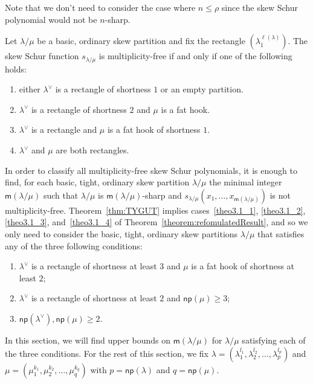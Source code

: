 \documentclass[ALCO,ThmDefs,Unicode,epreuves]{cedram}
\newcommand{\np}{\mathsf{np}}
\newcommand{\msf}{\mathsf{m}}
\begin{document}
Note that we don't need to consider the case where $n\leq \rho$ since the skew Schur polynomial would not be $n$-sharp.



\begin{theorem}[\cite{G10, TY10}]
\label{thm:TYGUT}
 Let $\lambda/\mu$ be a basic, ordinary skew partition and fix the rectangle $(\lambda_1^{\ell(\lambda)})$. The skew Schur function $s_{\lambda/\mu}$ is multiplicity-free if and only if one of the following holds:
 \begin{enumerate}[label=(\Roman{*})]
 \item\label{theo3.2_1} either $\lambda^\vee$ is a rectangle of shortness $1$ or an empty partition.
 \item\label{theo3.2_2} $\lambda^\vee$ is a rectangle of shortness $2$ and $\mu$ is a fat hook.
 \item\label{theo3.2_3} $\lambda^\vee$ is a rectangle and $\mu$ is a fat hook of shortness $1$.
	 \item\label{theo3.2_4} $\lambda^\vee$ and $\mu$ are both rectangles.
 \end{enumerate}
\end{theorem}

In order to classify all multiplicity-free skew Schur polynomials, it is enough to find, for each basic, tight, ordinary skew partition $\lambda/\mu$ the minimal integer $\msf(\lambda/\mu)$ such that $\lambda/\mu$ is $\msf (\lambda/\mu)$-sharp and $s_{\lambda/\mu}(x_1,\ldots,x_{\msf (\lambda/\mu)})$ is not multiplicity-free. Theorem~\ref{thm:TYGUT} implies cases~\ref{theo3.1_1}, \ref{theo3.1_2}, \ref{theo3.1_3}, and~\ref{theo3.1_4} of Theorem~\ref{theorem:refomulatedResult}, and so we only need to consider the basic, tight, ordinary skew partitions $\lambda/\mu$ that satisfies any of the three following conditions:
\begin{enumerate}[label=(\Roman{*})]
 \item\label{theo3.2_cond1} $\lambda^\vee$ is a rectangle of shortness at least $3$ and $\mu$ is a fat hook of shortness at least $2$;
 \item\label{theo3.2_cond2} $\lambda^\vee$ is a rectangle of shortness at least $2$ and $\np (\mu) \geq 3$;
 \item\label{theo3.2_cond3} $\np (\lambda^\vee), \np (\mu) \geq 2$.
\end{enumerate}
 In this section, we will find upper bounds on $\msf (\lambda/\mu)$ for $\lambda/\mu$ satisfying each of the three conditions. For the rest of this section, we fix $\lambda = (\lambda_1^{l_1},\lambda_2^{l_2},\ldots,\lambda_p^{l_p})$ and $\mu = (\mu_1^{k_1},\mu_2^{k_2},\ldots,\mu_q^{k_q})$ with $p = \np (\lambda)$ and $q = \np (\mu)$.
\end{document}
